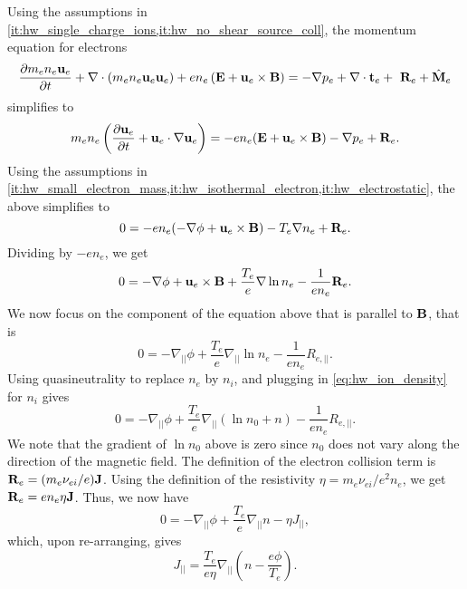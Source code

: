 \documentclass[11pt]{article}
\begin{document}
Using the assumptions in \cref{it:hw_single_charge_ions,it:hw_no_shear_source_coll}, the momentum equation for electrons 
\begin{equation}
    \frac{\partial m_e n_e \mathbf{u}_e}{\partial t} + \nabla \cdot \left ( m_e n_e \mathbf{u}_e \mathbf{u}_e \right ) + e n_e \left ( \mathbf{E} + \mathbf{u}_e \times \mathbf{B} \right ) = -\nabla p_e + \nabla \cdot \mathbf{t}_e + \ \mathbf{R}_e + \hat{\mathbf{M}}_e
\end{equation}
simplifies to
\begin{equation}
    m_e n_e \left (\frac{\partial \mathbf{u}_e}{\partial t} + \mathbf{u}_e \cdot \nabla \mathbf{u}_e \right ) = -e n_e (\mathbf{E} + \mathbf{u}_e \times \mathbf{B}) - \nabla p_e + \mathbf{R}_e.
\end{equation}
Using the assumptions in \cref{it:hw_small_electron_mass,it:hw_isothermal_electron,it:hw_electrostatic}, the above simplifies to
\begin{equation}
    0 = -e n_e (-\nabla \phi + \mathbf{u}_e \times \mathbf{B}) - T_e \nabla n_e + \mathbf{R}_e.
\end{equation}
Dividing by $-e n_e$, we get
\begin{equation}
    \label{eq:hw_electron_momentum_no_inertia}
    0 = -\nabla \phi + \mathbf{u}_e \times \mathbf{B} + \frac{T_e}{e} \nabla \ln n_e - \frac{1}{e n_e}\mathbf{R}_e.
\end{equation}
We now focus on the component of the equation above that is parallel to $\mathbf{B}$, that is 
\begin{equation}
    0 = -\nabla_{||} \phi + \frac{T_e}{e} \nabla_{||} \ln n_e - \frac{1}{e n_e} R_{e,||}.
\end{equation}
Using quasineutrality to replace $n_e$ by $n_i$, and plugging in \cref{eq:hw_ion_density} for $n_i$ gives 
\begin{equation}
    0 = -\nabla_{||} \phi + \frac{T_e}{e} \nabla_{||} (\ln n_0 + n) - \frac{1}{e n_e} R_{e,||}.
\end{equation}
We note that the gradient of $\ln n_0$ above is zero since $n_0$ does not vary along the direction of the magnetic field. The definition of the electron collision term is $\mathbf{R}_e = (m_e \nu_{ei}/e) \mathbf{J}$. Using the definition of the resistivity $\eta = m_e \nu_{ei}/e^2 n_e$, we get $\mathbf{R}_e = e n_e \eta \mathbf{J}$. Thus, we now have
\begin{equation}
    0 = -\nabla_{||} \phi + \frac{T_e}{e} \nabla_{||} n - \eta J_{||},
\end{equation}
which, upon re-arranging, gives
\begin{equation}
    \label{eq:hw_electron_momentum}
    J_{||} = \frac{T_e}{e \eta} \nabla_{||} \left ( n - \frac{e\phi}{T_e} \right ).
\end{equation}
\end{document}
